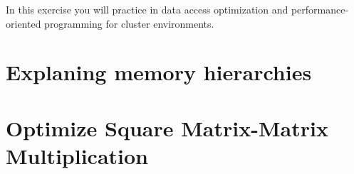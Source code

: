 \documentclass[unicode,11pt,a4paper,oneside,numbers=endperiod,openany]{scrartcl}
\begin{document}
\setassignment
{}

\newline

In this exercise you will practice in data access optimization and performance-oriented programming for cluster environments.


\section{Explaning memory hierarchies }


\section{Optimize Square Matrix-Matrix Multiplication  }
\end{document}
